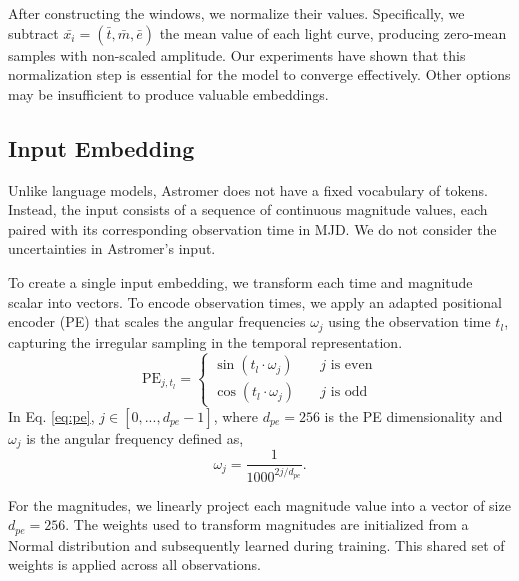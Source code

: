 After constructing the windows, we normalize their values. Specifically, we subtract $\bar{x_i} = (\bar{t}, \bar{m}, \bar{e})$ the mean value of each light curve, producing zero-mean samples with non-scaled amplitude. Our experiments have shown that this normalization step is essential for the model to converge effectively. Other options may be insufficient to produce valuable embeddings.


\subsection{Input Embedding}\label{sec:input_embedding}
Unlike language models, Astromer does not have a fixed vocabulary of tokens. Instead, the input consists of a sequence of continuous magnitude values, each paired with its corresponding observation time in MJD. We do not consider the uncertainties in Astromer's input.

To create a single input embedding, we transform each time and magnitude scalar into vectors. To encode observation times, we apply an adapted positional encoder (PE) that scales the angular frequencies $\omega_j$ using the observation time $t_l$, capturing the irregular sampling in the temporal representation.
\begin{equation}\label{eq:pe}
\text{PE}_{\textit{j}, t_{l}} = \left\{
        \begin{array}{ll}
            \sin{(t_{l}\cdot\omega_{\textit{j}})} & \quad j \text{ is even} \\
            \cos{(t_{l}\cdot\omega_{\textit{j}})} & \quad j \text{ is odd}
        \end{array}
    \right.
\end{equation}
In Eq. \ref{eq:pe}, $\textit{j} \in [0,...,d_{pe}-1] $, where $d_{pe}=256$ is the PE dimensionality and $\omega_\textit{j}$ is the angular frequency defined as,
\begin{equation}\label{eq:angular_freq}
    \omega_{\textit{j}} = \frac{1}{1000^{2\textit{j}/d_{pe}}}.
\end{equation}

For the magnitudes, we linearly project each magnitude value into a vector of size $d_{pe}=256$. The weights used to transform magnitudes are initialized from a Normal distribution and subsequently learned during training. This shared set of weights is applied across all observations.

